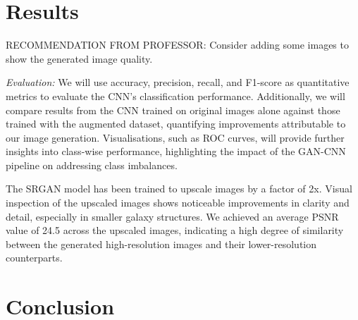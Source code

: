 \documentclass[10pt,twocolumn,letterpaper]{article}
\begin{document}
\section{Results}
RECOMMENDATION FROM PROFESSOR:
Consider adding some images to show the generated image quality.

\textit{Evaluation:} We will use accuracy, precision, recall, and F1-score as quantitative metrics to evaluate the CNN's classification performance. 
Additionally, we will compare results from the CNN trained on original images alone against those trained with the augmented dataset, quantifying improvements attributable to our image generation. 
Visualisations, such as ROC curves, will provide further insights into class-wise performance, highlighting the impact of the GAN-CNN pipeline on addressing class imbalances.

The SRGAN model has been trained to upscale images by a factor of 2x. 
Visual inspection of the upscaled images shows noticeable improvements in clarity and detail, especially in smaller galaxy structures. 
We achieved an average PSNR value of 24.5 across the upscaled images, indicating a high degree of similarity between the generated high-resolution images and their lower-resolution counterparts.

\section{Conclusion}

{
    \small
    \nocite{*}
    
    
}
\end{document}
